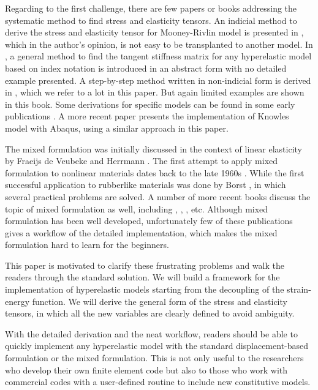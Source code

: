 Regarding to the first challenge, there are few papers or books addressing the systematic method to find stress and elasticity tensors. An indicial method to derive the stress and elasticity tensor for Mooney-Rivlin model is presented in \cite{Bower}, which in the author's opinion, is not easy to be transplanted to another model. In \cite{Belytschko}, a general method to find the tangent stiffness matrix for any hyperelastic model based on index notation is introduced in an abstract form with no detailed example presented. A step-by-step method written in non-indicial form is derived in \cite{Holzapfel}, which we refer to a lot in this paper. But again limited examples are shown in this book. Some derivations for specific models can be found in some early publications \cite{Weiss, Nicholson}. A more recent paper \cite{Suchocki} presents the implementation of Knowles model with Abaqus, using a similar approach in this paper.

The mixed formulation was initially discussed in the context of linear elasticity by Fraeijs de Veubeke \cite{Veubeke} and Herrmann \cite{Herrmann}. The first attempt to apply mixed formulation to nonlinear materials dates back to the late 1960s \cite{Oden}. While the first successful application to rubberlike materials was done by Borst \cite{Borst}, in which several practical problems are solved. A number of more recent books discuss the topic of mixed formulation as well, including \cite{Bathe}, \cite{Holzapfel}, \cite{Zienkiewicz}, etc. Although mixed formulation has been well developed, unfortunately few of these publications gives a workflow of the detailed implementation, which makes the mixed formulation hard to learn for the beginners. 

This paper is motivated to clarify these frustrating problems and walk the readers through the standard solution. We will build a framework for the implementation of hyperelastic models starting from the decoupling of the strain-energy function. We will derive the general form of the stress and elasticity tensors, in which all the new variables are clearly defined to avoid ambiguity. 


With the detailed derivation and the neat workflow, readers should be able to quickly implement any hyperelastic model with the standard displacement-based formulation or the mixed formulation. This is not only useful to the researchers who develop their own finite element code but also to those who work with commercial codes with a user-defined routine to include new constitutive models.

